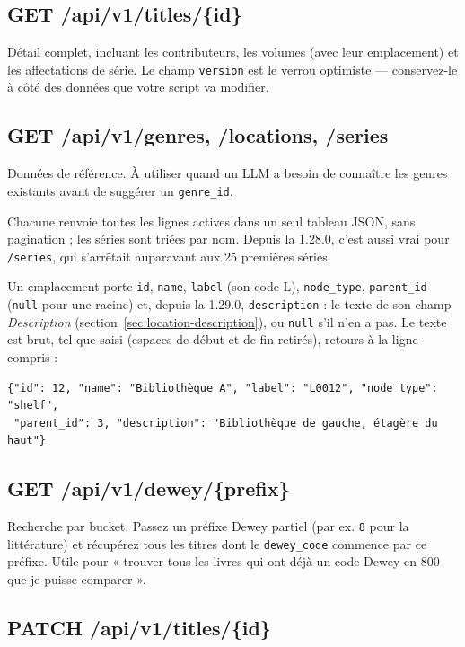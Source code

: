 \subsection{GET /api/v1/titles/\{id\}}

Détail complet, incluant les contributeurs, les volumes (avec leur
emplacement) et les affectations de série. Le champ
\texttt{version} est le verrou optimiste — conservez-le à côté des
données que votre script va modifier.

\subsection{GET /api/v1/genres, /locations, /series}

Données de référence. À utiliser quand un LLM a besoin de connaître
les genres existants avant de suggérer un \texttt{genre\_id}.

Chacune renvoie toutes les lignes actives dans un seul tableau JSON,
sans pagination ; les séries sont triées par nom. Depuis la 1.28.0,
c'est aussi vrai pour \texttt{/series}, qui s'arrêtait auparavant aux
25 premières séries.

Un emplacement porte \texttt{id}, \texttt{name}, \texttt{label} (son
code L), \texttt{node\_type}, \texttt{parent\_id} (\texttt{null} pour
une racine) et, depuis la 1.29.0, \texttt{description} : le texte de son
champ \emph{Description} (section~\ref{sec:location-description}), ou
\texttt{null} s'il n'en a pas. Le texte est brut, tel que saisi (espaces
de début et de fin retirés), retours à la ligne compris :

\begin{lstlisting}
{"id": 12, "name": "Bibliothèque A", "label": "L0012", "node_type": "shelf",
 "parent_id": 3, "description": "Bibliothèque de gauche, étagère du haut"}
\end{lstlisting}

\subsection{GET /api/v1/dewey/\{prefix\}}

Recherche par bucket. Passez un préfixe Dewey partiel (par ex.
\texttt{8} pour la littérature) et récupérez tous les titres dont
le \texttt{dewey\_code} commence par ce préfixe. Utile pour
« trouver tous les livres qui ont déjà un code Dewey en 800 que je
puisse comparer ».

\subsection{PATCH /api/v1/titles/\{id\}}

